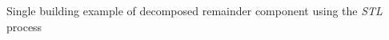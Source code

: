 Single building example of decomposed remainder component using the \emph{STL} process
\label{fig:remainder_single}